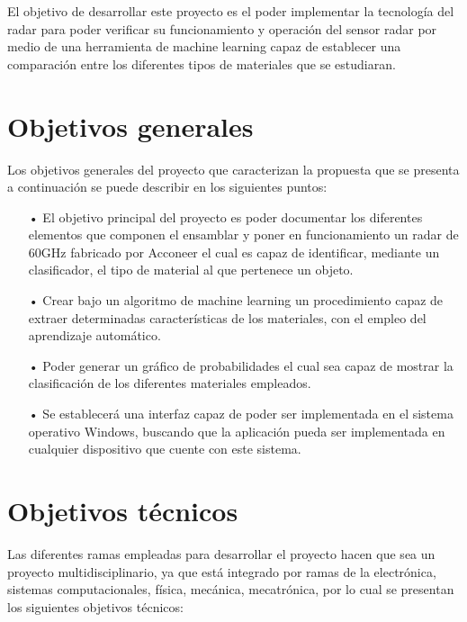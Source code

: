 
El objetivo de desarrollar este proyecto es el poder implementar la tecnología del radar para poder verificar su funcionamiento y operación del sensor radar por medio de una herramienta de machine learning capaz de establecer una comparación entre los diferentes tipos de materiales que se estudiaran.

\section{Objetivos generales}

Los objetivos generales del proyecto que caracterizan la propuesta que se presenta a continuación se puede describir en los siguientes puntos:
\begin{itemize}
\item[•] El objetivo principal del proyecto es poder documentar los diferentes elementos que componen el ensamblar y poner en funcionamiento un radar de 60GHz fabricado por Acconeer el cual es capaz de identificar, mediante un clasificador, el tipo de material al que pertenece un objeto.

\item[•] Crear bajo un algoritmo de machine learning un procedimiento capaz de extraer determinadas características de los materiales, con el empleo del aprendizaje automático.

\item[•] Poder generar un gráfico de probabilidades el cual sea capaz de mostrar la clasificación de los diferentes materiales empleados.

\item[•]Se establecerá una interfaz capaz de poder ser implementada en el sistema operativo Windows, buscando que la aplicación pueda ser implementada en cualquier dispositivo que cuente con este sistema.
\end{itemize}

\section{Objetivos técnicos}

Las diferentes ramas empleadas para desarrollar el proyecto hacen que sea un proyecto multidisciplinario, ya que está integrado por ramas de la electrónica, sistemas computacionales, física, mecánica, mecatrónica, por lo cual se presentan los siguientes objetivos técnicos:

